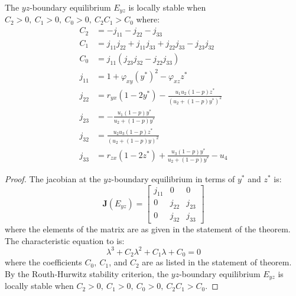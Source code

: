 \begin{theorem}\label{thm:boundary-yz-stability}
    The $yz$-boundary equilibrium $E_{yz}$ is locally stable when $C_2>0,\ C_1>0,\ C_0>0,\ C_2C_1>C_0$ where:
    \begin{align*}
        C_2 &= -j_{11}-j_{22}-j_{33}\\
        C_1 &= j_{11}j_{22}+j_{11}j_{33}+j_{22}j_{33}-j_{23}j_{32}\\
        C_0 &= j_{11}\left(j_{23}j_{32}-j_{22}j_{33}\right)\\
        j_{11} &= 1+\varphi_{xy}\left(y^*\right)^2-\varphi_{xz}z^*\\
        j_{22} &= r_{yx}\left(1-2y^*\right)-\frac{u_1u_2\left(1-p\right)z^*}{\left(u_2+\left(1-p\right)y^*\right)^2}\\
        j_{23} &= -\frac{u_1\left(1-p\right)y^*}{u_2+\left(1-p\right)y^*}\\
        j_{32} &= \frac{u_2u_3\left(1-p\right)z^*}{\left(u_2+\left(1-p\right)y\right)^2}\\
        j_{33} &= r_{zx}\left(1-2z^*\right)+\frac{u_3\left(1-p\right)y^*}{u_2+\left(1-p\right)y^*}-u_4
    \end{align*}
\end{theorem}
\begin{proof}
    The jacobian at the $yz$-boundary equilibrium in terms of $y^*$ and $z^*$ is:
    \begin{equation}\label{matrix:jacobian-boundary-yz}
        \textbf{J}\left(E_{yz}\right) = \begin{bmatrix}
            j_{11} & 0 & 0\\
            0 & j_{22} & j_{23}\\
            0 & j_{32} & j_{33}
        \end{bmatrix}
    \end{equation}
    where the elements of the matrix are as given in the statement of the theorem. The characteristic equation to  is:
    \begin{equation*}\label{eq:char-eq-yz}
        \lambda^3+C_2\lambda^2+C_1\lambda+C_0=0
    \end{equation*}
    where the coefficients $C_0,\ C_1$, and $C_2$ are as listed in the statement of theorem. By the Routh-Hurwitz stability criterion, the $yz$-boundary equilibrium $E_{yz}$ is locally stable when $C_2>0,\ C_1>0,\ C_0>0,\ C_2C_1>C_0$.
\end{proof}

